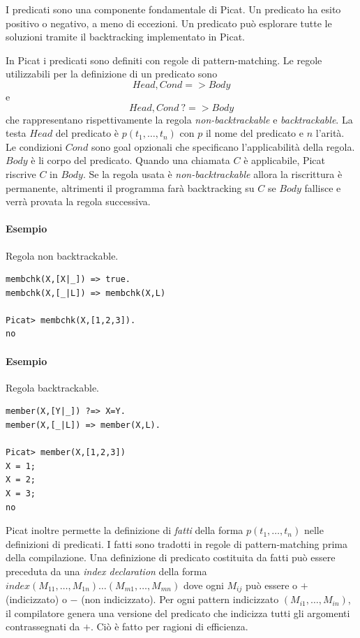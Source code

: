 \documentclass[12pt,a4paper,openright]{book}  %
\begin{document}
I predicati sono una componente fondamentale di Picat. Un predicato ha
esito positivo o negativo, a meno di eccezioni. Un predicato può
esplorare tutte le soluzioni tramite il backtracking implementato in
Picat.

In Picat i predicati sono definiti con regole di pattern-matching. Le
regole utilizzabili per la definizione di un predicato sono 
\[ Head, Cond => Body \]
e
\[Head, Cond\ ?=> Body \] che rappresentano
rispettivamente la regola \emph{non-backtrackable} e
\emph{backtrackable}. La testa $Head$ del predicato è $p(t_1, \ldots,
t_n)$ con $p$ il nome del predicato e $n$ l'arità. Le condizioni
$Cond$ sono goal opzionali che specificano l'applicabilità della
regola. $Body$ è li corpo del predicato.  Quando una chiamata $C$ è
applicabile, Picat riscrive $C$ in $Body$. Se la regola usata è
\emph{non-backtrackable} allora la riscrittura è permanente,
altrimenti il programma farà backtracking su $C$ se $Body$ fallisce e
verrà provata la regola successiva.

\paragraph{Esempio} Regola non backtrackable.
\begin{verbatim}
membchk(X,[X|_]) => true.
membchk(X,[_|L]) => membchk(X,L)

Picat> membchk(X,[1,2,3]).
no
\end{verbatim}

\paragraph{Esempio} Regola backtrackable.
\begin{verbatim}
member(X,[Y|_]) ?=> X=Y.
member(X,[_|L]) => member(X,L).

Picat> member(X,[1,2,3])
X = 1;
X = 2;
X = 3;
no
\end{verbatim}

Picat inoltre permette la definizione di \emph{fatti} della forma
$p(t_1, \ldots, t_n)$ nelle definizioni di predicati. I fatti sono
tradotti in regole di pattern-matching prima della compilazione. Una
definizione di predicato costituita da fatti può essere preceduta da
una \emph{index declaration} della forma $index (M_{11}, \ldots,
M_{1n}) \ldots (M_{m1}, \ldots, M_{mn})$ dove ogni $M_{ij}$ può essere
o $+$ (indicizzato) o $-$ (non indicizzato). Per ogni pattern
indicizzato $(M_{i1}, \ldots, M_{in})$, il compilatore genera una
versione del predicato che indicizza tutti gli argomenti
contrassegnati da $+$. Ciò è fatto per ragioni di efficienza.
\end{document}
